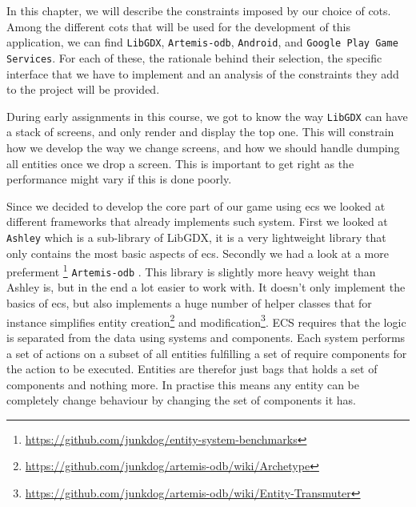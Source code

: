 
In this chapter, we will describe the constraints imposed by our choice of \gls{cots}. Among the different \gls{cots} that will be used for the development of this application, we can find \texttt{LibGDX}, \texttt{Artemis-odb}, \texttt{Android}, and \texttt{Google Play Game Services}. For each of these, the rationale behind their selection, the specific interface that we have to implement and an analysis of the constraints they add to the project will be provided.



During early assignments in this course, we got to know the way \texttt{LibGDX} \citep{libgdx} can have a stack of screens, and only render and display the top one. This will constrain how we develop the way we change screens, and how we should handle dumping all entities once we drop a screen. This is important to get right as the performance might vary if this is done poorly.

Since we decided to develop the core part of our game using \gls{ecs} we looked at different frameworks that already implements such system. First we looked at \texttt{Ashley} \citep{ashley} which is a sub-library of LibGDX, it is a very lightweight library that only contains the most basic aspects of ecs. Secondly we had a look at a more preferment \footnote{\url{https://github.com/junkdog/entity-system-benchmarks}} \texttt{Artemis-odb} \citep{artemis-odb}. This library is slightly more heavy weight than Ashley is, but in the end a lot easier to work with. It doesn't only implement the basics of ecs, but also implements a huge number of helper classes that for instance simplifies entity creation\footnote{\url{https://github.com/junkdog/artemis-odb/wiki/Archetype}} and modification\footnote{\url{https://github.com/junkdog/artemis-odb/wiki/Entity-Transmuter}}. ECS requires that the logic is separated from the data using systems and components. Each system performs a set of actions on a subset of all entities fulfilling a set of require components for the action to be executed. Entities are therefor just bags that holds a set of components and nothing more. In practise this means any entity can be completely change behaviour by changing the set of components it has.

